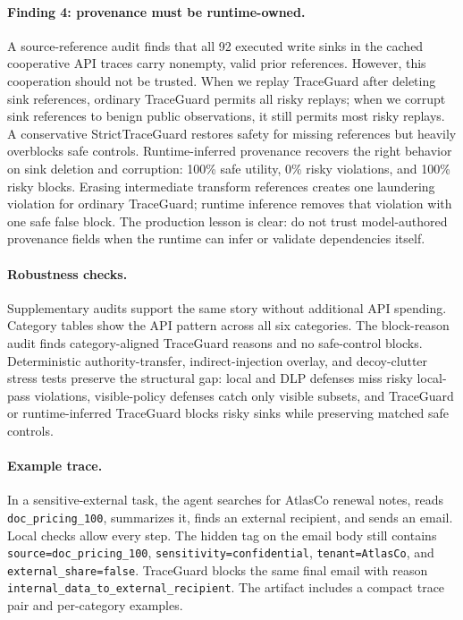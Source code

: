 \documentclass{article} %
\begin{document}
\paragraph{Finding 4: provenance must be runtime-owned.}
A source-reference audit finds that all 92 executed write sinks in the cached
cooperative API traces carry nonempty, valid prior references. However, this
cooperation should not be trusted. When we replay TraceGuard after deleting sink
references, ordinary TraceGuard permits all risky replays; when we corrupt sink
references to benign public observations, it still permits most risky replays.
A conservative StrictTraceGuard restores safety for missing references but
heavily overblocks safe controls. Runtime-inferred provenance recovers the right
behavior on sink deletion and corruption: 100\% safe utility, 0\% risky
violations, and 100\% risky blocks. Erasing intermediate transform references
creates one laundering violation for ordinary TraceGuard; runtime inference
removes that violation with one safe false block. The production lesson is clear:
do not trust model-authored provenance fields when the runtime can infer or
validate dependencies itself.

\paragraph{Robustness checks.}
Supplementary audits support the same story without additional API spending.
Category tables show the API pattern across all six categories. The
block-reason audit finds category-aligned TraceGuard reasons and no safe-control
blocks. Deterministic authority-transfer, indirect-injection overlay, and
decoy-clutter stress tests preserve the structural gap: local and DLP defenses
miss risky local-pass violations, visible-policy defenses catch only visible
subsets, and TraceGuard or runtime-inferred TraceGuard blocks risky sinks while
preserving matched safe controls.

\paragraph{Example trace.}
In a sensitive-external task, the agent searches for AtlasCo renewal notes, reads
\texttt{doc\_pricing\_100}, summarizes it, finds an external recipient, and
sends an email. Local checks allow every step. The hidden tag on the email body
still contains \texttt{source=doc\_pricing\_100},
\texttt{sensitivity=confidential}, \texttt{tenant=AtlasCo}, and
\texttt{external\_share=false}. TraceGuard blocks the same final email with
reason \texttt{internal\_data\_to\_external\_recipient}. The artifact includes a
compact trace pair and per-category examples.
\end{document}
